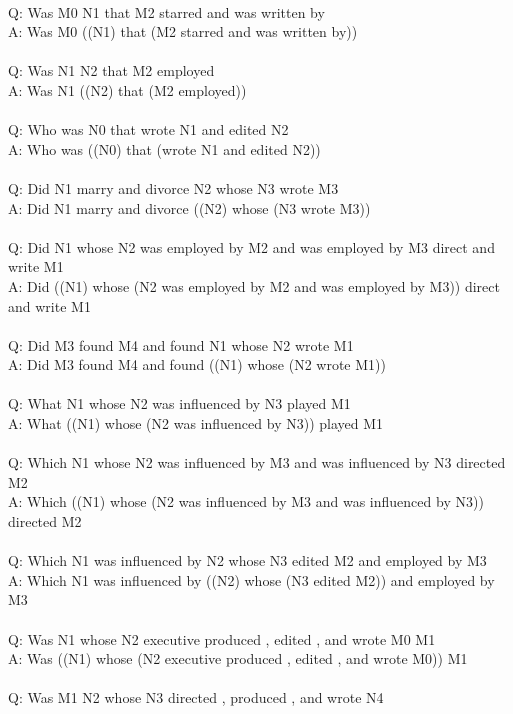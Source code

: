 \documentclass{article} \usepackage{iclr2022_conference,times}
\begin{document}
{ \\
Q: Was M0 N1 that M2 starred and was written by \\
A: Was M0 ((N1) that (M2 starred and was written by)) \\
 \\
Q: Was N1 N2 that M2 employed \\
A: Was N1 ((N2) that (M2 employed)) \\
 \\
Q: Who was N0 that wrote N1 and edited N2 \\
A: Who was ((N0) that (wrote N1 and edited N2)) \\
 \\
Q: Did N1 marry and divorce N2 whose N3 wrote M3 \\
A: Did N1 marry and divorce ((N2) whose (N3 wrote M3)) \\
 \\
Q: Did N1 whose N2 was employed by M2 and was employed by M3 direct and write M1 \\
A: Did ((N1) whose (N2 was employed by M2 and was employed by M3)) direct and write M1 \\
 \\
Q: Did M3 found M4 and found N1 whose N2 wrote M1 \\
A: Did M3 found M4 and found ((N1) whose (N2 wrote M1)) \\
 \\
Q: What N1 whose N2 was influenced by N3 played M1 \\
A: What ((N1) whose (N2 was influenced by N3)) played M1 \\
 \\
Q: Which N1 whose N2 was influenced by M3 and was influenced by N3 directed M2 \\
A: Which ((N1) whose (N2 was influenced by M3 and was influenced by N3)) directed M2 \\
 \\
Q: Which N1 was influenced by N2 whose N3 edited M2 and employed by M3 \\
A: Which N1 was influenced by ((N2) whose (N3 edited M2)) and employed by M3 \\
 \\
Q: Was N1 whose N2 executive produced , edited , and wrote M0 M1 \\
A: Was ((N1) whose (N2 executive produced , edited , and wrote M0)) M1 \\
 \\
Q: Was M1 N2 whose N3 directed , produced , and wrote N4 \\
}
\end{document}
